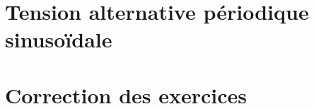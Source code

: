 \documentclass[12pt,a4paper]{article}
\begin{document}
\section{Tension alternative périodique sinusoïdale}








\begin{myexos}
\end{myexos}
\appendix

\newpage

\section*{Correction des exercices}
\end{document}
